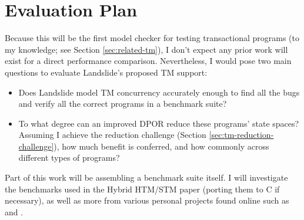 \section{Evaluation Plan}

Because this will be the first model checker for testing transactional programs
(to my knowledge; see Section \ref{sec:related-tm}),
I don't expect any prior work will exist for a direct performance comparison.
Nevertheless, I would pose two main questions to evaluate Landslide's proposed TM support:
\begin{itemize}
	\item Does Landslide model TM concurrency accurately enough to find all the bugs and verify all the correct programs in a benchmark suite?
	\item To what degree can an improved DPOR reduce these programs' state spaces? Assuming I achieve the reduction challenge (Section \ref{sec:tm-reduction-challenge}), how much benefit is conferred, and how commonly across different types of programs?
\end{itemize}

Part of this work will be assembling a benchmark suite itself.
I will investigate the benchmarks used in the Hybrid HTM/STM paper \cite{hybrid-htm-stm} (porting them to C if necessary),
as well as more from various personal projects found online such as \cite{tm-benchmark-github} and \cite{tm-benchmark-cmu}.
